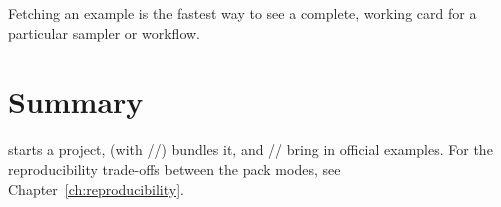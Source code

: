 \noindent Fetching an example is the fastest way to see a complete, working card for a particular
sampler or workflow.

\section{Summary}
\label{sec:proj-summary}

 starts a project,  (with //)
bundles it, and // bring in official examples. For the
reproducibility trade-offs between the pack modes, see Chapter~\ref{ch:reproducibility}.
